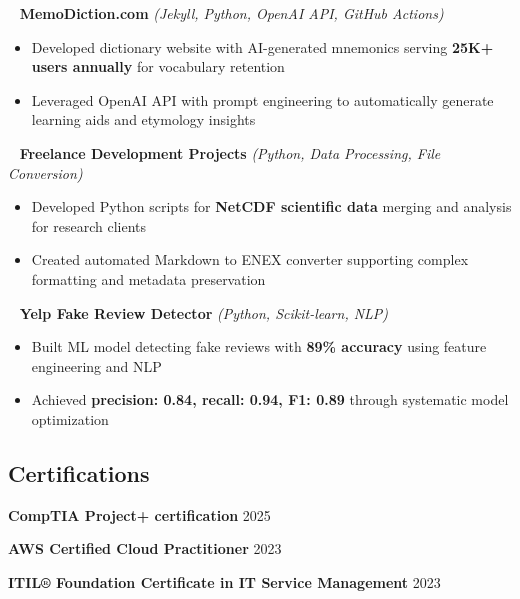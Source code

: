 \documentclass[11pt,letterpaper]{article}
\newcommand{\normalsizesection}{\normalsize}
\newcommand{\smallersection}{\small}
\newcommand{\sectionbox}[1]{%
    \vspace{0.2em}
    \begin{tcolorbox}[
        colback=sectionbg,
        colframe=sectionbg,
        width=\textwidth,
        left=5pt,
        right=5pt,
        top=2pt,
        bottom=2pt,
        boxrule=0pt,
        arc=0pt,
        boxsep=0pt,
    ]
    \section*{#1}
    \end{tcolorbox}
    \vspace{-0.3em}
}
\newcommand{\tech}[1]{\textit{(#1)}}
\newenvironment{projectentry}{%
    \leftskip=0cm
    \par\noindent
}{\par\leftskip=0cm\vspace{-2pt}}
\newenvironment{projectdesc}{%
    \footnotesize
    \begin{itemize}[leftmargin=*, topsep=0pt, itemsep=1pt, parsep=0pt]
}{\end{itemize}\smallersection\vspace{-1pt}}
\newcommand{\projicon}[1]{%
    {\small\color{gray!70}#1}~%
}
\begin{document}
\begin{projectentry}
    \projicon{\faGlobe} \textbf{MemoDiction.com} \tech{Jekyll, Python, OpenAI API, GitHub Actions}
\end{projectentry}
\begin{projectdesc}
    \item Developed dictionary website with AI-generated mnemonics serving \textbf{25K+ users annually} for vocabulary retention
    \item Leveraged OpenAI API with prompt engineering to automatically generate learning aids and etymology insights
\end{projectdesc}

\begin{projectentry}
    \projicon{\faBriefcase} \textbf{Freelance Development Projects} \tech{Python, Data Processing, File Conversion}
\end{projectentry}
\begin{projectdesc}
    \item Developed Python scripts for \textbf{NetCDF scientific data} merging and analysis for research clients
    \item Created automated Markdown to ENEX converter supporting complex formatting and metadata preservation
\end{projectdesc}


\begin{projectentry}
    \projicon{\faSearch} \textbf{Yelp Fake Review Detector} \tech{Python, Scikit-learn, NLP}
\end{projectentry}
\begin{projectdesc}
    \item Built ML model detecting fake reviews with \textbf{89\% accuracy} using feature engineering and NLP
    \item Achieved \textbf{precision: 0.84, recall: 0.94, F1: 0.89} through systematic model optimization
\end{projectdesc}


\normalsizesection

\sectionbox{Certifications}
\smallersection

\noindent\textbf{CompTIA Project+ certification} \hfill 2025

\vspace{-1pt}
\noindent\textbf{AWS Certified Cloud Practitioner} \hfill 2023

\vspace{-1pt}
\noindent\textbf{ITIL® Foundation Certificate in IT Service Management} \hfill 2023
\end{document}
